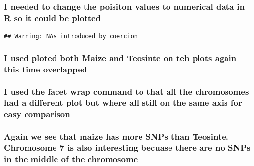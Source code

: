 \documentclass[
]{article}
\newenvironment{Shaded}{\begin{snugshade}}{\end{snugshade}}
\newcommand{\FunctionTok}[1]{\textcolor[rgb]{0.13,0.29,0.53}{\textbf{#1}}}
\newcommand{\NormalTok}[1]{#1}
\newcommand{\OtherTok}[1]{\textcolor[rgb]{0.56,0.35,0.01}{#1}}
\newcommand{\SpecialCharTok}[1]{\textcolor[rgb]{0.81,0.36,0.00}{\textbf{#1}}}
\begin{document}
\subsubsection{I needed to change the poisiton values to numerical data
in R so it could be
plotted}\label{i-needed-to-change-the-poisiton-values-to-numerical-data-in-r-so-it-could-be-plotted}

\begin{Shaded}
\end{Shaded}

\begin{verbatim}
## Warning: NAs introduced by coercion
\end{verbatim}

\subsubsection{I used ploted both Maize and Teosinte on teh plots again
this time
overlapped}\label{i-used-ploted-both-maize-and-teosinte-on-teh-plots-again-this-time-overlapped}

\subsubsection{I used the facet wrap command to that all the chromosomes
had a different plot but where all still on the same axis for easy
comparison}\label{i-used-the-facet-wrap-command-to-that-all-the-chromosomes-had-a-different-plot-but-where-all-still-on-the-same-axis-for-easy-comparison}

\subsubsection{\texorpdfstring{\textbf{Again we see that maize has more
SNPs than Teosinte. Chromosome 7 is also interesting becuase there are
no SNPs in the middle of the
chromosome}}{Again we see that maize has more SNPs than Teosinte. Chromosome 7 is also interesting becuase there are no SNPs in the middle of the chromosome}}\label{again-we-see-that-maize-has-more-snps-than-teosinte.-chromosome-7-is-also-interesting-becuase-there-are-no-snps-in-the-middle-of-the-chromosome}
\end{document}
